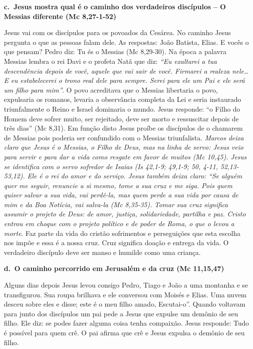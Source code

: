 \documentclass[
]{book}
\begin{document}
\textbf{c.~Jesus mostra qual é o caminho dos verdadeiros discípulos -- O Messias diferente (Mc 8,27-1-52)}

Jesus vai com os discípulos para os povoados da Cesárea. No caminho Jesus pergunta o que as pessoas falam dele. As respostas: João Batista, Elias. E vocês o que pensam? Pedro diz: Tu és o Messias (Mc 8,29-30). Na época a palavra Messias lembra o rei Davi e o profeta Natã que diz: \emph{``Eu exaltarei a tua descendência depois de você, aquele que vai sair de você. Firmarei a realeza nele\ldots{} E eu estabelecerei o trono real dele para sempre. Serei para ele um Pai e ele será um filho para mim''}. O povo acreditava que o Messias libertaria o povo, expulsaria os romanos, levaria a observância completa da Lei e seria instaurado triunfalmente o Reino e Israel dominaria o mundo. Jesus responde: ``o Filho do Homem deve sofrer muito, ser rejeitado, deve ser morto e ressuscitar depois de três dias'' (Mc 8,31). Em função disto Jesus proíbe os discípulos de o chamarem de Messias pois poderia ser confundido com o Messias triunfalista. \emph{Marcos deixa claro que Jesus é o Messias, o Filho de Deus, mas na linha de servo: Jesus veio para servir e para dar a vida como resgate em favor de muitos (Mc 10,45). Jesus se identifica com o servo sofredor de Isaias (Is 42,1-9; 49,1-9; 50, 4-11, 52,13-53,12). Ele é o rei do amor e do serviço. Jesus também deixa claro: ``Se alguém quer me seguir, renuncie a si mesmo, tome a sua cruz e me siga. Pois quem quiser salvar a sua vida, vai perdê-la, mas quem perde a sua vida por causa de mim e da Boa Notícia, vai salva-la (Mc 8,35-35). Tomar sua cruz significa assumir o projeto de Deus: de amor, justiça, solidariedade, partilha e paz. Cristo entrou em choque com o projeto político e de poder de Roma, o que o levou a morte}. Faz parte da vida do cristão sofrimentos e perseguições que esta escolha nos impõe e essa é a nossa cruz. Cruz significa doação e entrega da vida. O verdadeiro discípulo deve ser manso e humilde como uma criança.

\textbf{d.~O caminho percorrido em Jerusalém e da cruz (Mc 11,15,47)}

Alguns dias depois Jesus levou consigo Pedro, Tiago e João a uma montanha e se transfigurou. Sua roupa brilhava e ele conversou com Moisés e Elias. Uma nuvem desceu sobre eles e disse; este é o meu filho amado, Escutai-o''. Quando voltavam para junto dos discípulos um pai pede a Jesus que expulse um demônio de seu filho. Ele diz: se podes fazer alguma coisa tenha compaixão. Jesus responde: Tudo é possível para quem crê. O pai afirma que crê e Jesus expulsa o demônio de seu filho.
\end{document}
